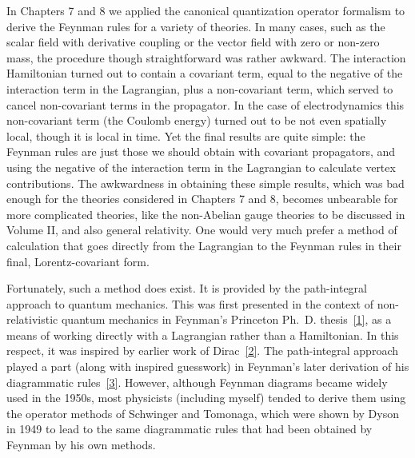 
In Chapters 7 and 8 we applied the canonical quantization operator formalism
to derive the Feynman rules for a variety of theories. In many cases, such
as the scalar field with derivative coupling or the vector field with zero or
non-zero mass, the procedure though straightforward was rather awkward.
The interaction Hamiltonian turned out to contain a covariant term, equal
to the negative of the interaction term in the Lagrangian, plus a non-covariant
term, which served to cancel non-covariant terms in the propagator. In the
case of electrodynamics this non-covariant term (the Coulomb energy) turned
out to be not even spatially local, though it is local in time. Yet the final
results are quite simple: the Feynman rules are just those we should obtain
with covariant propagators, and using the negative of the interaction term
in the Lagrangian to calculate vertex contributions. The awkwardness in
obtaining these simple results, which was bad enough for the theories
considered in Chapters 7 and 8, becomes unbearable for more complicated
theories, like the non-Abelian gauge theories to be discussed in Volume II,
and also general relativity. One would very much prefer a method of
calculation that goes directly from the Lagrangian to the Feynman rules in
their final, Lorentz-covariant form.

Fortunately, such a method does exist. It is provided by the path-integral
approach to quantum mechanics. This was first presented in the context of
non-relativistic quantum mechanics in Feynman's Princeton Ph.\ D. thesis~\hyperref[ref:9.1]{[1]},
as a means of working directly with a Lagrangian rather than a Hamiltonian.
In this respect, it was inspired by earlier work of Dirac~\hyperref[ref:9.2]{[2]}. The path-integral
approach played a part (along with inspired guesswork) in Feynman's later
derivation of his diagrammatic rules~\hyperref[ref:9.3]{[3]}. However, although Feynman diagrams
became widely used in the 1950s, most physicists (including myself) tended
to derive them using the operator methods of Schwinger and Tomonaga, which
were shown by Dyson in 1949 to lead to the same diagrammatic rules that had
been obtained by Feynman by his own methods.

